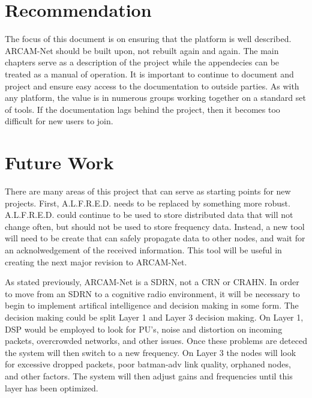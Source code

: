
\section{Recommendation}

The focus of this document is on ensuring that the platform is well described. ARCAM-Net should be built upon, not rebuilt again and again. The main chapters serve as a description of the project while the appendecies can be treated as a manual of operation. It is important to continue to document and project and ensure easy access to the documentation to outside parties. As with any platform, the value is in numerous groups working together on a standard set of tools. If the documentation lags behind the project, then it becomes too difficult for new users to join. 


\section{Future Work}

There are many areas of this project that can serve as starting points for new projects. First, A.L.F.R.E.D. needs to be replaced by something more robust. A.L.F.R.E.D. could continue to be used to store distributed data that will not change often, but should not be used to store frequency data. Instead, a new tool will need to be create that can safely propagate data to other nodes, and wait for an acknolwedgement of the received information. This tool will be useful in creating the next major revision to ARCAM-Net. 

As stated previously, ARCAM-Net is a SDRN, not a CRN or CRAHN. In order to move from an SDRN to a cognitive radio environment, it will be necessary to begin to implement artifical intelligence and decision making in some form. The decision making could be split Layer 1 and Layer 3 decision making. On Layer 1, DSP would be employed to look for PU's, noise and distortion on incoming packets, overcrowded networks, and other issues. Once these problems are deteced the system will then switch to a new frequency. On Layer 3 the nodes will look for excessive dropped packets, poor batman-adv link quality, orphaned nodes, and other factors. The system will then adjust gains and frequencies until this layer has been optimized. 

